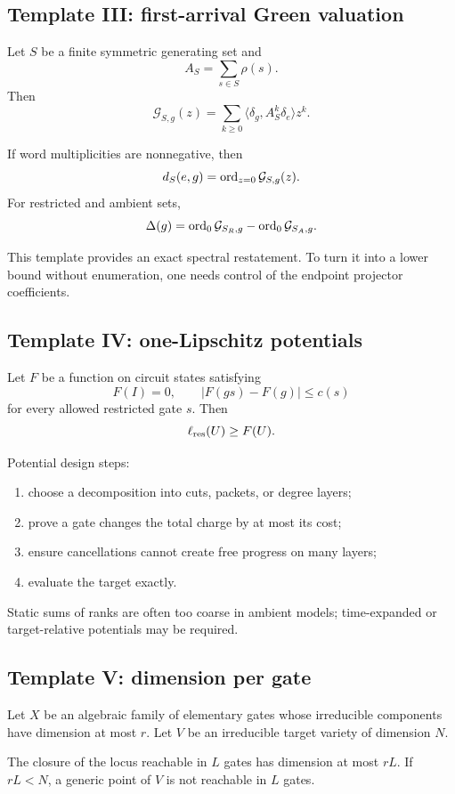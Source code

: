 \subsection{Template III: first-arrival Green valuation}
Let $S$ be a finite symmetric generating set and
\[
A_S=\sum_{s\in S}\rho(s).
\]
Then
\[
\mathcal G_{S,g}(z)
=\sum_{k\ge0}\langle\delta_g,A_S^k\delta_e\rangle z^k.
\]

\begin{theorem}
If word multiplicities are nonnegative, then
\[
d_S(e,g)=\operatorname{ord}_{z=0}\mathcal G_{S,g}(z).
\]
For restricted and ambient sets,
\[
\Delta(g)=\operatorname{ord}_0\mathcal G_{S_R,g}-\operatorname{ord}_0\mathcal G_{S_A,g}.
\]
\end{theorem}

This template provides an exact spectral restatement.  To turn it into a lower bound without enumeration, one needs control of the endpoint projector coefficients.

\subsection{Template IV: one-Lipschitz potentials}
Let $F$ be a function on circuit states satisfying
\[
F(I)=0,
\qquad
|F(gs)-F(g)|\le c(s)
\]
for every allowed restricted gate $s$.  Then
\[
\ell_{\mathrm{res}}(U)\ge F(U).
\]

Potential design steps:
\begin{enumerate}
\item choose a decomposition into cuts, packets, or degree layers;
\item prove a gate changes the total charge by at most its cost;
\item ensure cancellations cannot create free progress on many layers;
\item evaluate the target exactly.
\end{enumerate}
Static sums of ranks are often too coarse in ambient models; time-expanded or target-relative potentials may be required.

\subsection{Template V: dimension per gate}
Let $X$ be an algebraic family of elementary gates whose irreducible components have dimension at most $r$.  Let $V$ be an irreducible target variety of dimension $N$.

\begin{theorem}
The closure of the locus reachable in $L$ gates has dimension at most $rL$.  If $rL<N$, a generic point of $V$ is not reachable in $L$ gates.
\end{theorem}

